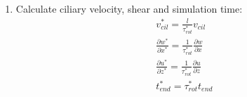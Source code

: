 \documentclass[10pt,a4paper]{article}
\def\non{\nonumber}
\def\p{\partial}
\def\l{\mathit{l}}
\begin{document}
\begin{enumerate}
\item Calculate ciliary velocity, shear and simulation time:
\begin{eqnarray}\label{nd2dpars4a}
	v^*_{cil} = \frac{\l}{\tau^*_{rot}}  v_{cil} \non \\
	\frac{\p w^*}{\p x^*} = \frac{1}{\tau^*_{rot}} \frac{\p w}{\p x} \non \\
	\frac{\p u^*}{\p z^*} = \frac{1}{\tau^*_{rot}} \frac{\p u}{\p z} \non \\
	t^*_{end} = \tau^*_{rot} t_{end}
\end{eqnarray}
	
\end{enumerate}
\end{document}
